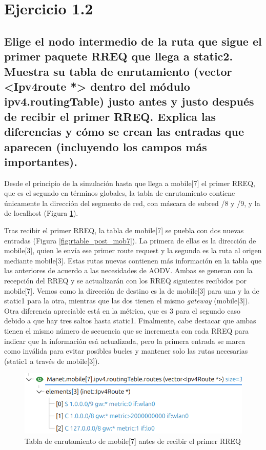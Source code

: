 \vspace{1.25cm}
\section{Ejercicio 1.2}

\subsection{Elige el nodo intermedio de la ruta que sigue el primer paquete RREQ que llega a static2. Muestra su tabla
de enrutamiento (vector <Ipv4route *> dentro del módulo ipv4.routingTable) justo antes y justo después de
recibir el primer RREQ. Explica las diferencias y cómo se crean las entradas que aparecen (incluyendo los campos
más importantes).}

Desde el principio de la simulación hasta que llega a mobile[7] el primer RREQ, que es el segundo en términos globales, la tabla de enrutamiento contiene únicamente la dirección del segmento de red, con máscara de subred /8 y /9, y la de localhost (Figura \ref{fig:rtable_prev_mob7}).

Tras recibir el primer RREQ, la tabla de mobile[7] se puebla con dos nuevas entradas (Figura \ref{fig:rtable_post_mob7}). La primera de ellas es la dirección de mobile[3], quien le envía ese primer route request y la segunda es la ruta al origen mediante mobile[3]. Estas rutas nuevas contienen más información en la tabla que las anteriores de acuerdo a las necesidades de AODV. Ambas se generan con la recepción del RREQ y se actualizarán con los RREQ siguientes recibidos por mobile[7]. Vemos como la dirección de destino es la de mobile[3] para una y la de static1 para la otra, mientras que las dos tienen el mismo \textit{gateway} (mobile[3]). Otra diferencia apreciable está en la métrica, que es 3 para el segundo caso debido a que hay tres saltos hasta static1. Finalmente, cabe destacar que ambas tienen el mismo número de secuencia que se incrementa con cada RREQ para indicar que la información esá actualizada, pero la primera entrada se marca como inválida para evitar posibles bucles y mantener solo las rutas necesarias (static1 a través de mobile[3]).

\begin{figure}[H]
    \centering
    \includegraphics[width=125mm, scale=0.75]{imaxes/ejercicio2_1.png}
    \caption{Tabla de enrutamiento de mobile[7] antes de recibir el primer RREQ}
    \label{fig:rtable_prev_mob7}
\end{figure}

